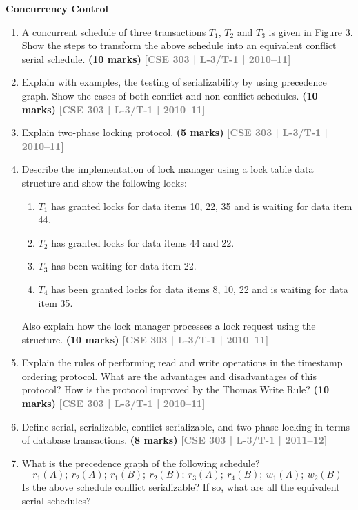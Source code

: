\documentclass[12pt,a3paper]{article}
\newcommand{\yr}[1]{\hfill\textcolor{gray}{\small\textbf{[#1]}}}
\newcommand{\mk}[1]{\textcolor{orange!70!black}{\small\textbf{(#1 marks)}}}
\newcommand{\subtopic}[2]{%
  \vspace{10pt}
  \noindent\begin{tcolorbox}[colback=#1!8,colframe=#1,boxrule=0.6pt,arc=4pt,
    left=6pt,right=6pt,top=4pt,bottom=4pt]
    \small\bfseries\textcolor{#1}{#2}
  \end{tcolorbox}
  \vspace{2pt}
}
\begin{document}
\subtopic{cE}{Concurrency Control}
\label{sub:s7-cc}

\begin{enumerate}

\item A concurrent schedule of three transactions $T_1$, $T_2$ and $T_3$ is given in Figure 3. Show the steps to transform the above schedule into an equivalent conflict serial schedule.
\mk{10} \yr{CSE 303 | L-3/T-1 | 2010--11}

\item Explain with examples, the testing of serializability by using precedence graph. Show the cases of both conflict and non-conflict schedules.
\mk{10} \yr{CSE 303 | L-3/T-1 | 2010--11}

\item Explain two-phase locking protocol.
\mk{5} \yr{CSE 303 | L-3/T-1 | 2010--11}

\item Describe the implementation of lock manager using a lock table data structure and show the following locks:
\begin{enumerate}
  \item $T_1$ has granted locks for data items 10, 22, 35 and is waiting for data item 44.
  \item $T_2$ has granted locks for data items 44 and 22.
  \item $T_3$ has been waiting for data item 22.
  \item $T_4$ has been granted locks for data items 8, 10, 22 and is waiting for data item 35.
\end{enumerate}
Also explain how the lock manager processes a lock request using the structure.
\mk{10} \yr{CSE 303 | L-3/T-1 | 2010--11}

\item Explain the rules of performing read and write operations in the timestamp ordering protocol. What are the advantages and disadvantages of this protocol? How is the protocol improved by the Thomas Write Rule?
\mk{10} \yr{CSE 303 | L-3/T-1 | 2010--11}

\item Define serial, serializable, conflict-serializable, and two-phase locking in terms of database transactions.
\mk{8} \yr{CSE 303 | L-3/T-1 | 2011--12}

\item What is the precedence graph of the following schedule?
\[r_1(A);\ r_2(A);\ r_1(B);\ r_2(B);\ r_3(A);\ r_4(B);\ w_1(A);\ w_2(B)\]
Is the above schedule conflict serializable? If so, what are all the equivalent serial schedules?


\end{enumerate}
\end{document}
